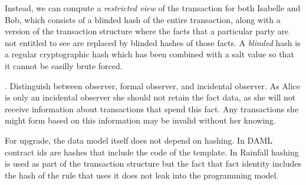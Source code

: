 Instead, we can compute a \emph{restricted view} of the transaction for both Isabelle and Bob, which consists of a blinded hash of the entire transaction, along with a version of the transaction structure where the facts that a particular party are not entitled to see are replaced by blinded hashes of those facts. A \emph{blinded} hash is a regular cryptographic hash which has been combined with a salt value so that it cannot be easilly brute forced.

. Distinguish between observer, formal observer, and incidental observer. As Alice is only an incidental observer she should not retain the fact data, as she will not receive information about transactions that spend this fact. Any transactions she might form based on this information may be invalid without her knowing.


For upgrade, the data model itself does not depend on hashing. In DAML contract ids are hashes that include the code of the template. In Rainfall hashing is used as part of the transaction structure but the fact that fact identity includes the hash of the rule that uses it does not leak into the programming model.







